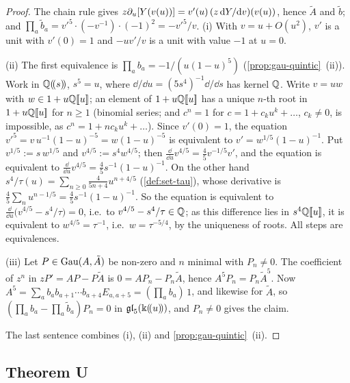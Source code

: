 \begin{proof}
The chain rule gives $z\partial_u[Y(v(u))]=v'(u)\,(z\,\mathrm{d} Y/\mathrm{d} v)(v(u))$, hence $\tilde A$ and $\tilde b$; and $\prod_a\tilde b_a=v'^5\cdot(-v^{-1})\cdot(-1)^2=-v'^5/v$. (i) With $v=u+O(u^2)$, $v'$ is a unit with $v'(0)=1$ and $-uv'/v$ is a unit with value $-1$ at $u=0$.

(ii) The first equivalence is $\prod_ab_a=-1/(u(1-u)^5)$ (\cref{prop:gau-quintic}~(ii)). Work in $\mathbb{Q}(\!(s)\!)$, $s^5=u$, where $\dd/\dd u=(5s^4)^{-1}\dd/\dd s$ has kernel $\mathbb{Q}$. Write $v=uw$ with $w\in1+u\mathbb{Q}[\![ u ]\!]$; an element of $1+u\mathbb{Q}[\![ u ]\!]$ has a unique $n$-th root in $1+u\mathbb{Q}[\![ u ]\!]$ for $n\geq1$ (binomial series; and $c^n=1$ for $c=1+c_ku^k+\dots$, $c_k\neq0$, is impossible, as $c^n=1+nc_ku^k+\dots$). Since $v'(0)=1$, the equation $v'^5=v\,u^{-1}(1-u)^{-5}=w(1-u)^{-5}$ is equivalent to $v'=w^{1/5}(1-u)^{-1}$. Put $v^{1/5}:=s\,w^{1/5}$ and $v^{4/5}:=s^4w^{4/5}$; then $\frac{\dd}{\dd u}v^{4/5}=\frac45v^{-1/5}v'$, and the equation is equivalent to $\frac{\dd}{\dd u}v^{4/5}=\frac45s^{-1}(1-u)^{-1}$. On the other hand $s^4/\tau(u)=\sum_{n\geq0}\frac{4}{5n+4}u^{n+4/5}$ (\cref{def:set-tau}), whose derivative is $\frac45\sum_nu^{n-1/5}=\frac45s^{-1}(1-u)^{-1}$. So the equation is equivalent to $\frac{\dd}{\dd u}\bigl(v^{4/5}-s^4/\tau\bigr)=0$, i.e.\ to $v^{4/5}-s^4/\tau\in\mathbb{Q}$; as this difference lies in $s^4\mathbb{Q}[\![ u ]\!]$, it is equivalent to $w^{4/5}=\tau^{-1}$, i.e.\ $w=\tau^{-5/4}$, by the uniqueness of roots. All steps are equivalences.

(iii) Let $P\in\operatorname{Gau}(A,\tilde A)$ be non-zero and $n$ minimal with $P_n\neq0$. The coefficient of $z^n$ in $zP'=AP-P\tilde A$ is $0=AP_n-P_n\tilde A$, hence $A^5P_n=P_n\tilde A^5$. Now $A^5=\sum_ab_ab_{a+1}\cdots b_{a+4}E_{a,a+5}=(\prod_ab_a)\,1$, and likewise for $\tilde A$, so $(\prod_ab_a-\prod_a\tilde b_a)P_n=0$ in $\mathfrak{gl}_5(\Bbbk(\!(u)\!))$, and $P_n\neq0$ gives the claim.

The last sentence combines (i), (ii) and \cref{prop:gau-quintic}~(ii).
\end{proof}

\subsection{Theorem U}
\label{sec:gau-U}

